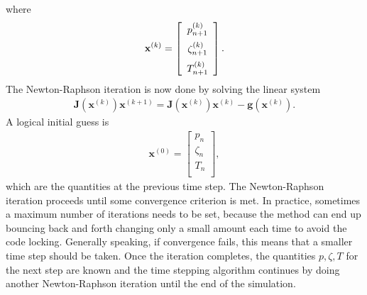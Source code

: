 where 
\begin{align}
  \mathbf{x}^{(k)} = \left[ \begin{array}{c} p_{n+1}^{(k)} \vspace{0.2cm} \\ \zeta_{n+1}^{(k)} \vspace{0.2cm} \\ T_{n+1}^{(k)} \\ \end{array} \right] .
\end{align}
The Newton-Raphson iteration is now done by solving the linear system
\begin{align}
  \mathbf{J}(\mathbf{x}^{(k)}) \mathbf{x}^{(k+1)} = \mathbf{J}(\mathbf{x}^{(k)}) \mathbf{x}^{(k)} -\mathbf{g}(\mathbf{x}^{(k)}) . \nonumber
\end{align}
A logical initial guess is
\begin{align}
  \mathbf{x}^{(0)} = \left[ \begin{array}{c} p_{n} \\ \zeta_{n} \\ T_{n} \\ \end{array} \right] ,
\end{align}
which are the quantities at the previous time step. The Newton-Raphson iteration proceeds until some convergence criterion is met. In practice, sometimes a maximum number of iterations needs to be set, because the method can end up bouncing back and forth changing only a small amount each time to avoid the code locking. Generally speaking, if convergence fails, this means that a smaller time step should be taken. Once the iteration completes, the quantities $p, \zeta, T$ for the next step are known and the time stepping algorithm continues by doing another Newton-Raphson iteration until the end of the simulation.

